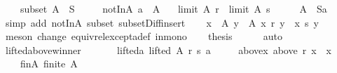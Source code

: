 \begin{isabellebody}
\ \ \ \ subset{\isacharcolon}{\kern0pt}\ {\isachardoublequoteopen}A\ {\isasymsubseteq}\ S{\isachardoublequoteclose}\ \isanewline
\ \ \ \ notInA{\isacharcolon}{\kern0pt}\ {\isachardoublequoteopen}a\ {\isasymnotin}\ A{\isachardoublequoteclose}\isanewline
\ \ \ {\isachardoublequoteopen}limit\ A\ r\ {\isacharequal}{\kern0pt}\ limit\ A\ s{\isachardoublequoteclose}\isanewline
%
\isadelimproof
%
\endisadelimproof
%
\isatagproof
{}\isamarkupfalse%
\ {\isacharminus}{\kern0pt}\isanewline
\ \ \isamarkupfalse%
\ {\isachardoublequoteopen}A\ {\isasymsubseteq}\ S{\isacharminus}{\kern0pt}{\isacharbraceleft}{\kern0pt}a{\isacharbraceright}{\kern0pt}{\isachardoublequoteclose}\isanewline
\ \ \ \ \isamarkupfalse%
\ {\isacharparenleft}{\kern0pt}simp\ add{\isacharcolon}{\kern0pt}\ notInA\ subset\ subset{\isacharunderscore}{\kern0pt}Diff{\isacharunderscore}{\kern0pt}insert{\isacharparenright}{\kern0pt}\isanewline
\ \ \isamarkupfalse%
\ {\isachardoublequoteopen}{\isasymforall}x\ {\isasymin}\ A{\isachardot}{\kern0pt}\ {\isasymforall}y\ {\isasymin}\ A{\isachardot}{\kern0pt}\ x\ {\isasympreceq}\isactrlsub r\ y\ {\isasymlongleftrightarrow}\ x\ {\isasympreceq}\isactrlsub s\ y{\isachardoublequoteclose}\isanewline
\ \ \ \ \isamarkupfalse%
\ {\isacharparenleft}{\kern0pt}meson\ change\ equiv{\isacharunderscore}{\kern0pt}rel{\isacharunderscore}{\kern0pt}except{\isacharunderscore}{\kern0pt}a{\isacharunderscore}{\kern0pt}def\ in{\isacharunderscore}{\kern0pt}mono{\isacharparenright}{\kern0pt}\isanewline
\ \ \isamarkupfalse%
\ {\isacharquery}{\kern0pt}thesis\isanewline
\ \ \ \ \isamarkupfalse%
\ auto\isanewline
{}\isamarkupfalse%
%
\endisatagproof
{\isafoldproof}%
%
\isadelimproof
\isanewline
%
\endisadelimproof
\isanewline
{}\isamarkupfalse%
\ lifted{\isacharunderscore}{\kern0pt}above{\isacharunderscore}{\kern0pt}winner{\isacharcolon}{\kern0pt}\isanewline
\ \ \isanewline
\ \ \ \ lifted{\isacharunderscore}{\kern0pt}a{\isacharcolon}{\kern0pt}\ {\isachardoublequoteopen}lifted\ A\ r\ s\ a{\isachardoublequoteclose}\ \isanewline
\ \ \ \ above{\isacharunderscore}{\kern0pt}x{\isacharcolon}{\kern0pt}\ {\isachardoublequoteopen}above\ r\ x\ {\isacharequal}{\kern0pt}\ {\isacharbraceleft}{\kern0pt}x{\isacharbraceright}{\kern0pt}{\isachardoublequoteclose}\ \isanewline
\ \ \ \ fin{\isacharunderscore}{\kern0pt}A{\isacharcolon}{\kern0pt}\ {\isachardoublequoteopen}finite\ A{\isachardoublequoteclose}\isanewline

\end{isabellebody}
